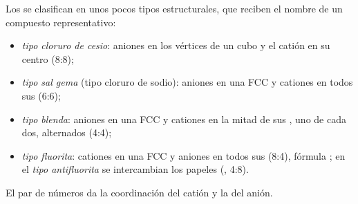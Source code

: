 \begin{definition}\label{def:b1:crystals-ionic-covalent:structure-type}
Los  se clasifican en unos pocos tipos estructurales,
que reciben el nombre de un compuesto representativo:
\begin{itemize}
  \item \emph{tipo cloruro de cesio}: aniones
        en los vértices de un cubo y el catión en su centro (8:8);
  \item \emph{tipo sal gema} (tipo cloruro de
        sodio): aniones en una  FCC y cationes en todos sus  (6:6);
  \item \emph{tipo blenda}: aniones en una  FCC y
        cationes en la mitad de sus , uno de cada dos,
        alternados (4:4);
  \item \emph{tipo fluorita}: cationes en una  FCC
        y aniones en todos sus  (8:4), fórmula
        ; en el \emph{tipo antifluorita}
        se intercambian los papeles (, 4:8).
\end{itemize}
El par de números da la coordinación del catión y la del anión.
\end{definition}

